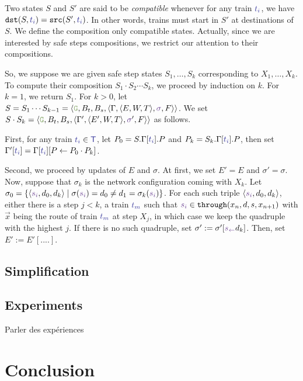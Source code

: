 \documentclass[runningheads]{llncs}
\newcommand{\throughS}{{\mathtt{through}}}
\newcommand{\swFmt}[1]{{\color{swcolor}{#1}}}
\newcommand{\sid}[1]{\ensuremath{\swFmt{s_{#1}}}}
\newcommand{\switches}{\ensuremath{\swFmt{\sigma}}}
\newcommand{\trainFmt}[1]{{\color{traincolor} #1}}
\newcommand{\trains}{{\trainFmt{\mathsf{T}}}}
\newcommand{\tid}[1]{\ensuremath{\trainFmt{t_{#1}}}}
\newcommand{\signals}{\ensuremath{F}}
\newcommand{\guardFmt}[1]{{\color{guardcolor} \ensuremath{\mathtt{#1}}}}
\newcommand{\guardG}{\guardFmt{G}}
\newcommand{\bufferFmt}[1]{#1}
\newcommand{\bufTrain}{\ensuremath{\bufferFmt{B_t}}\xspace}
\newcommand{\bufSig}{\ensuremath{\bufferFmt{B_s}}\xspace}
\begin{document}
Two states $S$ and $S'$ are said to be \emph{compatible} whenever  for any train $\tid{i}$, we have $\mathtt{dst}(S, \tid{i})  =  \mathtt{src}(S', \tid{i})$. In other words, trains must start in $S'$ at destinations of $S$. We define the composition only compatible states. Actually, since we are interested by safe steps compositions, we restrict our attention to their compositions.
  
So, we suppose we are given safe step states $S_1, \ldots, S_k$ corresponding to $X_1, \ldots, X_k$. To compute their composition $S_1 \cdot S_2 \cdots S_k$, we proceed by induction on $k$. For $k = 1$, we return $S_1$. For $k>0$, let $S = S_1 \cdots S_{k-1}  = \langle \guardG, \bufTrain, \bufSig, \langle \Gamma, \langle E, W, T\rangle, \switches, \signals\rangle \rangle$. We set $S \cdot S_k = \langle \guardG, \bufTrain, \bufSig, \langle \Gamma', \langle E', W, T\rangle, \switches', \signals\rangle \rangle$ as follows. 

First,  for any train $\tid{i} \in \trains$, let $P_0 = S.\Gamma[\tid{i}].P$ and $P_k = S_k.\Gamma[\tid{i}].P$, then set $\Gamma'[\tid{i}] = \Gamma[\tid{i}][ P \leftarrow P_0 \cdot P_k]$. 

Second, we proceed by updates of $E$ and $\sigma$. At first, we set $E' = E$ and $\sigma' = \sigma$. Now, suppose that $\sigma_k$ is the network configuration coming with $X_k$. Let $\sigma_0 = \{ \langle \sid{i}, d_0, d_k \rangle \mid \sigma(\sid{i}) = d_0 \neq d_1 = \sigma_k(\sid{i})\}$. For each such triple $\langle \sid{i}, d_0, d_k\rangle$, either there is a step $j < k$, a train $\tid{m}$ such that $\sid{i} \in \throughS(x_n, d, s, x_{n+1})$ with $\vec{x}$ being the route of train $\tid{m}$ at step $X_j$, in which case we keep the quadruple with the highest $j$. If there is no such quadruple, set $\sigma' := \sigma'[ \sid \leftarrow d_k]$.  Then, set $E' := E'[ ....]$.   

\subsection{Simplification}

\subsection{Experiments} 
Parler des expériences

\section{Conclusion}
\label{sec:conclusion}
\end{document}
